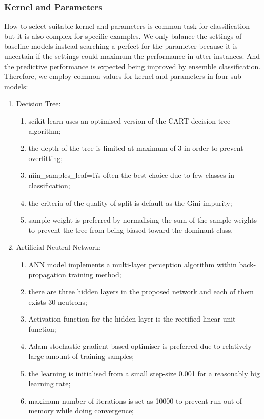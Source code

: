 \documentclass[runningheads]{llncs}
\begin{document}
\subsubsection{Kernel and Parameters}
%
How to select suitable kernel and parameters is common task for classification but it is also complex for specific examples. We only balance the settings of baseline models instead searching a perfect for the parameter because it is uncertain if the settings could maximum the performance in utter instances. And the predictive performance is expected being improved by ensemble classification. Therefore, we employ common values for kernel and parameters in four sub-models:

\begin{enumerate}[label=\Roman*)]
	\item	  Decision Tree:
	\begin{enumerate}[label=\arabic*)]
		\item scikit-learn uses an optimised version of the CART decision tree algorithm;
		\item the depth of the tree is limited at maximum of 3 in order to prevent overfitting;
		\item \"min\_samples\_leaf=1\" is often the best choice due to few classes in classification;
		\item the criteria of the quality of split is default as the Gini impurity;
		\item sample weight is preferred by normalising the sum of the sample weights to prevent the tree from being biased toward the dominant class.\\
	\end{enumerate}
	\item   Artificial Neutral Network:
	\begin{enumerate}[label=\arabic*)]
		\item ANN model implements a multi-layer perception algorithm within back-propagation training method;
		\item there are three hidden layers in the proposed network and each of them exists 30 neutrons;
		\item Activation function for the hidden layer is the rectified linear unit function;
		\item Adam stochastic gradient-based optimiser is preferred due to relatively large amount of training samples;
		\item the learning is initialised from a small step-size 0.001 for a reasonably big learning rate;
		\item	maximum number of iterations is set as 10000 to prevent run out of memory while doing convergence;

\end{enumerate}
\end{enumerate}
\end{document}
